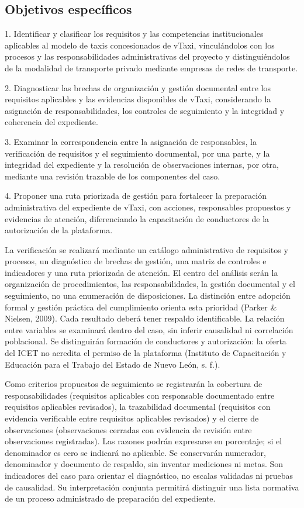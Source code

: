 {\subsection{Objetivos específicos}
1. Identificar y clasificar los requisitos y las competencias institucionales aplicables al modelo de taxis concesionados de vTaxi, vinculándolos con los procesos y las responsabilidades administrativas del proyecto y distinguiéndolos de la modalidad de transporte privado mediante empresas de redes de transporte.


2. Diagnosticar las brechas de organización y gestión documental entre los requisitos aplicables y las evidencias disponibles de vTaxi, considerando la asignación de responsabilidades, los controles de seguimiento y la integridad y coherencia del expediente.


3. Examinar la correspondencia entre la asignación de responsables, la verificación de requisitos y el seguimiento documental, por una parte, y la integridad del expediente y la resolución de observaciones internas, por otra, mediante una revisión trazable de los componentes del caso.


4. Proponer una ruta priorizada de gestión para fortalecer la preparación administrativa del expediente de vTaxi, con acciones, responsables propuestos y evidencias de atención, diferenciando la capacitación de conductores de la autorización de la plataforma.


La verificación se realizará mediante un catálogo administrativo de requisitos y procesos, un diagnóstico de brechas de gestión, una matriz de controles e indicadores y una ruta priorizada de atención. El centro del análisis serán la organización de procedimientos, las responsabilidades, la gestión documental y el seguimiento, no una enumeración de disposiciones. La distinción entre adopción formal y gestión práctica del cumplimiento orienta esta prioridad (Parker \& Nielsen, 2009). Cada resultado deberá tener respaldo identificable. La relación entre variables se examinará dentro del caso, sin inferir causalidad ni correlación poblacional. Se distinguirán formación de conductores y autorización: la oferta del ICET no acredita el permiso de la plataforma (Instituto de Capacitación y Educación para el Trabajo del Estado de Nuevo León, s. f.).

Como criterios propuestos de seguimiento se registrarán la cobertura de responsabilidades (requisitos aplicables con responsable documentado entre requisitos aplicables revisados), la trazabilidad documental (requisitos con evidencia verificable entre requisitos aplicables revisados) y el cierre de observaciones (observaciones cerradas con evidencia de revisión entre observaciones registradas). Las razones podrán expresarse en porcentaje; si el denominador es cero se indicará no aplicable. Se conservarán numerador, denominador y documento de respaldo, sin inventar mediciones ni metas. Son indicadores del caso para orientar el diagnóstico, no escalas validadas ni pruebas de causalidad. Su interpretación conjunta permitirá distinguir una lista normativa de un proceso administrado de preparación del expediente.


}
